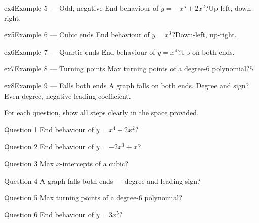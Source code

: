 \documentclass[11pt]{article}
\begin{document}
\begin{example}{ex4}{Example 5 --- Odd, negative}
End behaviour of $y=-x^5+2x^2$?\soln Up-left, down-right.
\end{example}

\begin{example}{ex5}{Example 6 --- Cubic ends}
End behaviour of $y=x^3$?\soln Down-left, up-right.
\end{example}

\begin{example}{ex6}{Example 7 --- Quartic ends}
End behaviour of $y=x^4$?\soln Up on both ends.
\end{example}

\begin{example}{ex7}{Example 8 --- Turning points}
Max turning points of a degree-6 polynomial?\soln $5$.
\end{example}

\begin{example}{ex8}{Example 9 --- Falls both ends}
A graph falls on both ends. Degree and sign?\soln Even degree, negative leading coefficient.
\end{example}

\clearpage
{}
For each question, show all steps clearly in the space provided.

\begin{qbox}{Question 1}
End behaviour of $y=x^4-2x^2$?\workspace{2.4cm}
\end{qbox}

\begin{qbox}{Question 2}
End behaviour of $y=-2x^3+x$?\workspace{2.4cm}
\end{qbox}

\begin{qbox}{Question 3}
Max $x$-intercepts of a cubic?\workspace{2.4cm}
\end{qbox}

\begin{qbox}{Question 4}
A graph falls both ends — degree and leading sign?\workspace{2.4cm}
\end{qbox}

\begin{qbox}{Question 5}
Max turning points of a degree-6 polynomial?\workspace{2.4cm}
\end{qbox}

\begin{qbox}{Question 6}
End behaviour of $y=3x^5$?\workspace{2.4cm}
\end{qbox}
\end{document}
